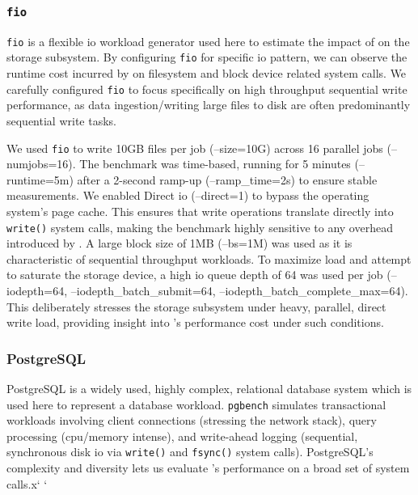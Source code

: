 \subsubsection{\texttt{fio}}\label{subsubsec:fio-just}
\texttt{fio}  is a flexible \ac{io} workload generator used here to estimate
the impact of \af on the storage subsystem. By configuring \texttt{fio} for
specific \ac{io} pattern, we can observe the runtime cost incurred by \af on
filesystem and block device related system calls. We carefully configured
\texttt{fio} to focus specifically on high throughput sequential write
performance, as data ingestion/writing large files to disk are often 
predominantly sequential write tasks.

We used \texttt{fio} to write 10GB files per job (--size=10G) across 16 parallel jobs 
(--numjobs=16).  The benchmark was time-based, running for 5 minutes 
(--runtime=5m) after a 2-second ramp-up (--ramp\_time=2s) to ensure stable 
measurements. We enabled Direct \ac{io} (--direct=1) to bypass the
operating system's page cache. This ensures that write operations translate 
directly into \texttt{write()} system calls, making the benchmark highly sensitive 
to any overhead introduced by \af. A large block size of 1MB (--bs=1M) was 
used as it is characteristic of sequential throughput workloads. To maximize 
load and attempt to saturate the storage device, a high \ac{io} queue depth of 64
was used per job (--iodepth=64, --iodepth\_batch\_submit=64,
--iodepth\_batch\_complete\_max=64). This deliberately stresses the storage 
subsystem under heavy, parallel, direct write load, providing insight into 
\af's performance cost under such conditions.

\subsubsection{PostgreSQL}\label{subsubsec:psql-just}

PostgreSQL is a widely used, highly complex, relational database system which is
used here to represent a database workload. \texttt{pgbench} simulates
transactional workloads involving client connections (stressing the network
stack), query processing (\ac{cpu}/memory intense), and write-ahead logging
(sequential, synchronous disk \ac{io} via \texttt{write()} and \texttt{fsync()}
system calls). PostgreSQL's complexity and diversity lets us evaluate \af's
performance on a broad set of system calls.x` `

